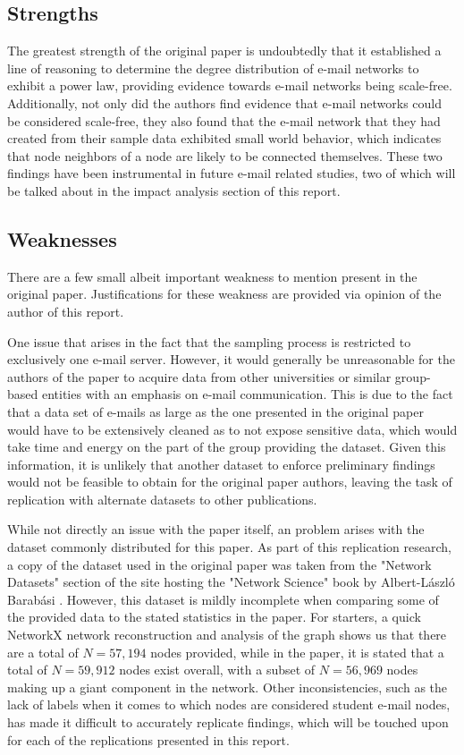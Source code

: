 \documentclass[11pt]{article}
\begin{document}
\begin{multicols}{2}
\subsection{Strengths}
\hspace*{\parindent}The greatest strength of the original paper is undoubtedly that it established a line of reasoning to determine the degree distribution of e-mail networks to exhibit a power law, providing evidence towards e-mail networks being scale-free. Additionally, not only did the authors find evidence that e-mail networks could be considered scale-free, they also found that the e-mail network that they had created from their sample data exhibited small world behavior, which indicates that node neighbors of a node are likely to be connected themselves. These two findings have been instrumental in future e-mail related studies, two of which will be talked about in the impact analysis section of this report.	

\subsection{Weaknesses}
\hspace*{\parindent}There are a few small albeit important weakness to mention present in the original paper. Justifications for these weakness are provided via opinion of the author of this report.

One issue that arises in the fact that the sampling process is restricted to exclusively one e-mail server. However, it would generally be unreasonable for the authors of the paper to acquire data from other universities or similar group-based entities with an emphasis on e-mail communication. This is due to the fact that a data set of e-mails as large as the one presented in the original paper would have to be extensively cleaned as to not expose sensitive data, which would take time and energy on the part of the group providing the dataset. Given this information, it is unlikely that another dataset to enforce preliminary findings would not be feasible to obtain for the original paper authors, leaving the task of replication with alternate datasets to other publications.

While not directly an issue with the paper itself, an problem arises with the dataset commonly distributed for this paper. As part of this replication research, a copy of the dataset used in the original paper was taken from the "Network Datasets" section of the site hosting the "Network Science" book by Albert-László Barabási \cite{3}. However, this dataset is mildly incomplete when comparing some of the provided data to the stated statistics in the paper. For starters, a quick NetworkX network reconstruction and analysis of the graph shows us that there are a total of \(N = 57,	194\) nodes provided, while in the paper, it is stated that a total of \(N = 59,912\) nodes exist overall, with a subset of \(N = 56,969\) nodes making up a giant component in the network. Other inconsistencies, such as the lack of labels when it comes to which nodes are considered student e-mail nodes, has made it difficult to accurately replicate findings, which will be touched upon for each of the replications presented in this report. 


\end{multicols}
\end{document}
